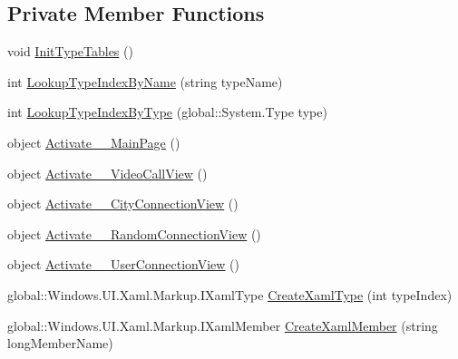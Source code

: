 \subsection*{Private Member Functions}
\begin{DoxyCompactItemize}
\item 
void \hyperlink{class_e_l_i_client_1_1_e_l_i_client___xaml_type_info_1_1_xaml_type_info_provider_a551110be263c526eade19b83971c73ca}{Init\+Type\+Tables} ()
\item 
int \hyperlink{class_e_l_i_client_1_1_e_l_i_client___xaml_type_info_1_1_xaml_type_info_provider_a3009bbb11c7cd77c0b2150ce8b2f1e83}{Lookup\+Type\+Index\+By\+Name} (string type\+Name)
\item 
int \hyperlink{class_e_l_i_client_1_1_e_l_i_client___xaml_type_info_1_1_xaml_type_info_provider_aef061eccf423d6179a7445e6a886268a}{Lookup\+Type\+Index\+By\+Type} (global\+::\+System.\+Type type)
\item 
object \hyperlink{class_e_l_i_client_1_1_e_l_i_client___xaml_type_info_1_1_xaml_type_info_provider_a4f5ed7fa109803ca4e77895515eb3c86}{Activate\+\_\+\_\+\+Main\+Page} ()
\item 
object \hyperlink{class_e_l_i_client_1_1_e_l_i_client___xaml_type_info_1_1_xaml_type_info_provider_a12923c75d1e077e681c27f80787699e6}{Activate\+\_\+\_\+\+Video\+Call\+View} ()
\item 
object \hyperlink{class_e_l_i_client_1_1_e_l_i_client___xaml_type_info_1_1_xaml_type_info_provider_a594a49912d4b1f94fbafdfecd8bcbdb7}{Activate\+\_\+\_\+\+City\+Connection\+View} ()
\item 
object \hyperlink{class_e_l_i_client_1_1_e_l_i_client___xaml_type_info_1_1_xaml_type_info_provider_a9dbfe6cbda6a19d2f569449928dd45bc}{Activate\+\_\+\_\+\+Random\+Connection\+View} ()
\item 
object \hyperlink{class_e_l_i_client_1_1_e_l_i_client___xaml_type_info_1_1_xaml_type_info_provider_a1df3c01fa00c7a6f4ace46ca59e699ab}{Activate\+\_\+\_\+\+User\+Connection\+View} ()
\item 
global\+::\+Windows.\+U\+I.\+Xaml.\+Markup.\+I\+Xaml\+Type \hyperlink{class_e_l_i_client_1_1_e_l_i_client___xaml_type_info_1_1_xaml_type_info_provider_afb9c01c2dd724369db4dcbbf42424ec0}{Create\+Xaml\+Type} (int type\+Index)
\item 
global\+::\+Windows.\+U\+I.\+Xaml.\+Markup.\+I\+Xaml\+Member \hyperlink{class_e_l_i_client_1_1_e_l_i_client___xaml_type_info_1_1_xaml_type_info_provider_abf3f2757986c5f7240025456fa57b28a}{Create\+Xaml\+Member} (string long\+Member\+Name)

\end{DoxyCompactItemize}
